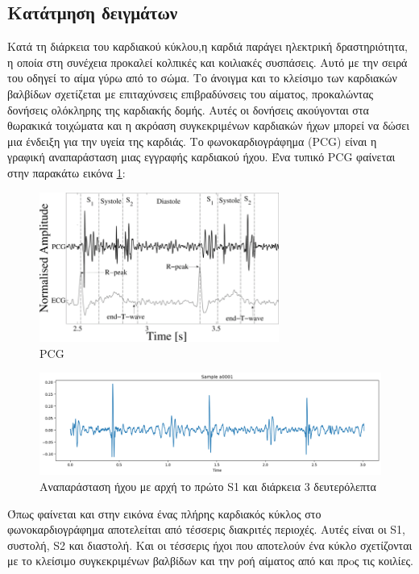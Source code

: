 \documentclass[../main.tex]{subfiles}
\begin{document}
\subsection{Κατάτμηση δειγμάτων}

Κατά τη διάρκεια του καρδιακού κύκλου,η καρδιά παράγει ηλεκτρική δραστηριότητα,
η οποία στη συνέχεια προκαλεί κολπικές και κοιλιακές συσπάσεις. Αυτό με την
σειρά του οδηγεί το αίμα γύρω από το σώμα. Το άνοιγμα και το κλείσιμο των
καρδιακών βαλβίδων σχετίζεται με επιταχύνσεις επιβραδύνσεις του αίματος,
προκαλώντας δονήσεις ολόκληρης της καρδιακής δομής. Αυτές οι δονήσεις ακούγονται
στα θωρακικά τοιχώματα και η ακρόαση συγκεκριμένων καρδιακών ήχων μπορεί να
δώσει μια ένδειξη για την υγεία της καρδιάς. Το φωνοκαρδιογράφημα (PCG) είναι η
γραφική αναπαράσταση μιας εγγραφής καρδιακού ήχου. Ένα τυπικό PCG φαίνεται στην
παρακάτω εικόνα \ref{fig:s1}:

\begin{figure}[H]
	\center
	\includegraphics[width=0.7\textwidth]{../images/pcg.png}
	\caption{PCG}
	\label{fig:s1}
\end{figure}


\begin{figure}[H]
	\includegraphics[width=\textwidth]{../images/a0001.png}
	\caption{Αναπαράσταση ήχου με αρχή το πρώτο S1 και διάρκεια 3 δευτερόλεπτα}
	\label{a0001_sound}
\end{figure}

Όπως φαίνεται και στην εικόνα ένας πλήρης καρδιακός κύκλος στο φωνοκαρδιογράφημα
αποτελείται από τέσσερις διακριτές περιοχές. Αυτές είναι οι S1, συστολή, S2 και
διαστολή. Και οι τέσσερις ήχοι που αποτελούν ένα κύκλο σχετίζονται με το
κλείσιμο συγκεκριμένων βαλβίδων και την ροή αίματος από και πρoς τις κοιλίες.
\end{document}
